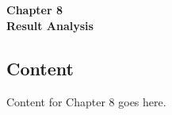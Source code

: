 
\titleformat{\chapter}[block]{\normalfont}{}{0pt}{}
\titlespacing{\chapter}{0pt}{-2em}{0pt}
\chapter[Result Analysis]{}
\vspace*{\fill}
\begin{center}
\textbf{\Huge{Chapter 8}}\\
\vspace{5mm}
\textbf{\Huge{Result Analysis}}
\end{center}
\vspace*{\fill}
\newpage

\titleformat{\chapter}[display]{\vspace{1cm}\normalfont\Large\bfseries\centering}{\chaptertitlename\ \thechapter}{20pt}{\vspace{0pt}}
\titlespacing*{\chapter}{0pt}{-50pt}{20pt}

\section{Content}
\justify

Content for Chapter 8 goes here.

